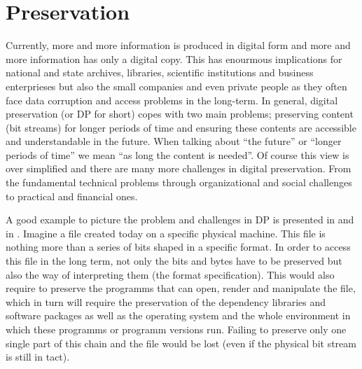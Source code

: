 \section{Preservation}
Currently, more and more information is produced in digital form and more and more information has only a digital copy. This has enourmous implications for national and state archives, libraries, scientific institutions and business enterprieses but also the small companies and even private people as they often face data corruption and access problems in the long-term.
In general, digital preservation (or DP for short) copes with two main problems; preserving content (bit streams) for longer periods of time and ensuring these contents are accessible and understandable in the future. When talking about ``the future'' or ``longer periods of time'' we mean ``as long the content is needed''.
Of course this view is over simplified and there are many more challenges in digital preservation. From the fundamental technical problems through organizational and social challenges to practical and financial ones.

A good example to picture the problem and challenges in DP is presented in \cite{Lorie:2001:LTP:379437.379726} and in \cite{Rauber:2009:dpchallenges}. Imagine a file created today on a specific physical machine. This file is nothing more than a series of bits shaped in a specific format. In order to access this file in the long term, not only the bits and bytes have to be preserved but also the way of interpreting them (the format specification). This would also require to preserve the programms that can open, render and manipulate the file, which in turn will require the preservation of the dependency libraries and software packages as well as the operating system and the whole environment in which these programms or programm versions run. Failing to preserve only one single part of this chain and the file would be lost (even if the physical bit stream is still in tact).

